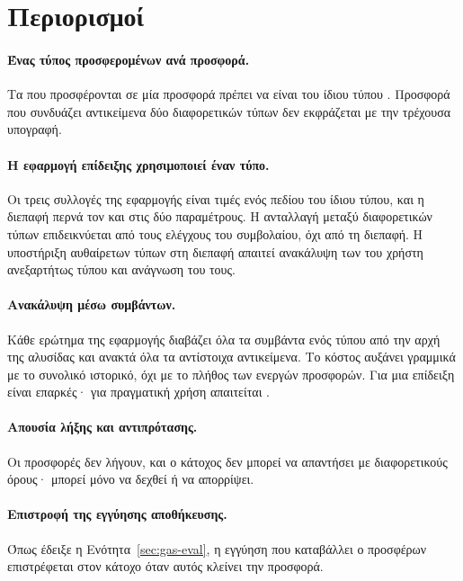 \section{Περιορισμοί}
\label{sec:limitations}

\paragraph{Ένας τύπος προσφερομένων ανά προσφορά.} Τα  που προσφέρονται σε μία
προσφορά πρέπει να είναι του ίδιου τύπου . Προσφορά που συνδυάζει αντικείμενα δύο
διαφορετικών τύπων δεν εκφράζεται με την τρέχουσα υπογραφή.

\paragraph{Η εφαρμογή επίδειξης χρησιμοποιεί έναν τύπο.} Οι τρεις συλλογές της εφαρμογής
είναι τιμές ενός πεδίου του ίδιου τύπου, και η διεπαφή περνά τον  και
στις δύο παραμέτρους. Η ανταλλαγή μεταξύ διαφορετικών τύπων επιδεικνύεται από τους ελέγχους
του συμβολαίου, όχι από τη διεπαφή. Η υποστήριξη αυθαίρετων τύπων στη διεπαφή απαιτεί
ανακάλυψη των  του χρήστη ανεξαρτήτως τύπου και ανάγνωση του  τους.

\paragraph{Ανακάλυψη μέσω συμβάντων.} Κάθε ερώτημα της εφαρμογής διαβάζει όλα τα συμβάντα
ενός τύπου από την αρχή της αλυσίδας και ανακτά όλα τα αντίστοιχα αντικείμενα. Το κόστος
αυξάνει γραμμικά με το συνολικό ιστορικό, όχι με το πλήθος των ενεργών προσφορών. Για μια
επίδειξη είναι επαρκές· για πραγματική χρήση απαιτείται .

\paragraph{Απουσία λήξης και αντιπρότασης.} Οι προσφορές δεν λήγουν, και ο κάτοχος δεν
μπορεί να απαντήσει με διαφορετικούς όρους· μπορεί μόνο να δεχθεί ή να απορρίψει.

\paragraph{Επιστροφή της εγγύησης αποθήκευσης.} Όπως έδειξε η
Ενότητα~\ref{sec:gas-eval}, η εγγύηση που καταβάλλει ο προσφέρων επιστρέφεται στον
κάτοχο όταν αυτός κλείνει την προσφορά.

